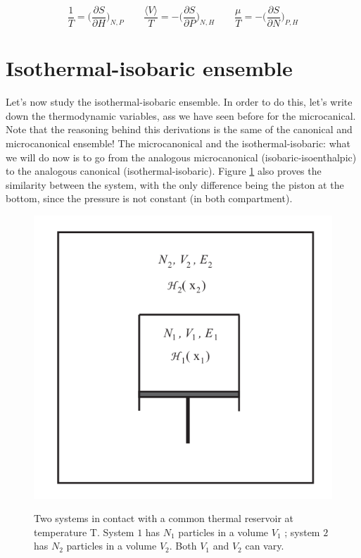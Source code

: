 	$$\frac{1}{T} = \biggl(\frac{\partial S}{\partial H}\biggr)_{N, P}\qquad \frac{\langle V\rangle}{T} = -\biggl(\frac{\partial S}{\partial P}\biggr)_{N, H}\qquad \frac{\mu}{T} = -\biggl(\frac{\partial S}{\partial N}\biggr)_{P, H}$$

\section{Isothermal-isobaric ensemble}
Let's now study the isothermal-isobaric ensemble. In order to do this, let's write down the thermodynamic variables, ass we have seen before for the microcanical.
Note that the reasoning behind this derivations is the same of the canonical and microcanonical ensemble!
The microcanonical and the isothermal-isobaric: what we will do now is to go from the analogous microcanonical (isobaric-isoenthalpic) to the analogous canonical (isothermal-isobaric).
Figure \ref{fig:isobar} also proves the similarity between the system, with the only difference being the piston at the bottom, since the pressure is not constant (in both compartment).

\begin{figure}
\center
\includegraphics[scale=0.4]{isobar}
\label{fig:isobar}
\caption{Two systems in contact with a common thermal reservoir at temperature T. System
$1$ has $N_1$ particles in a volume $V_1$ ; system $2$ has $N_2$ particles in a volume $V_2$. Both $V_1$ and $V_2$ can vary.}
\end{figure}

